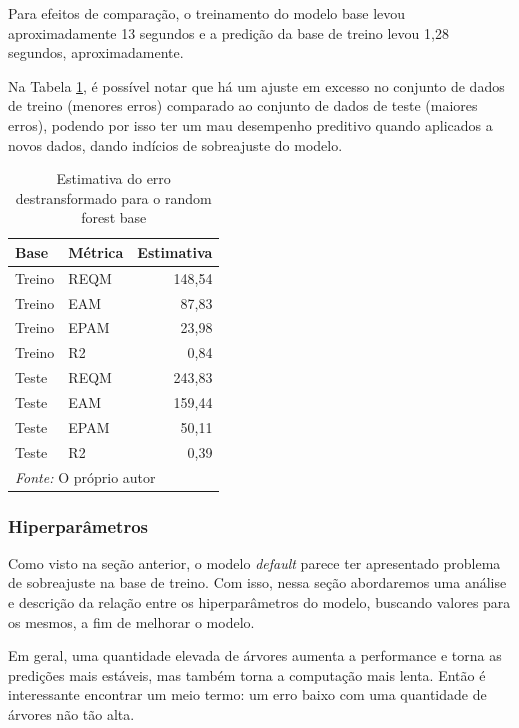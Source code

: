 \documentclass[
	12pt,				%
	a4paper,		%
	oneside,    %
	chapter=TITLE,		   %
	section=TITLE,		   %
	subsection=TITLE,	   %
	subsubsection=TITLE, %
	english,			%
	french,				%
	spanish,			%
	brazil,				%
]{abntex2}
\begin{document}
Para efeitos de comparação, o treinamento do modelo base levou
aproximadamente 13 segundos e a predição da base de treino levou 1,28
segundos, aproximadamente.

Na Tabela \ref{tab:rf0_metricas}, é possível notar que há um ajuste em
excesso no conjunto de dados de treino (menores erros) comparado ao
conjunto de dados de teste (maiores erros), podendo por isso ter um mau
desempenho preditivo quando aplicados a novos dados, dando indícios de
sobreajuste do modelo.

\begin{table}

\caption{\label{tab:rf0_metricas}Estimativa do erro destransformado para o random forest base}
\centering
\begin{tabular}[t]{l|l|r}
\hline
Base & Métrica & Estimativa\\
\hline
Treino & REQM & 148,54\\
\hline
Treino & EAM & 87,83\\
\hline
Treino & EPAM & 23,98\\
\hline
Treino & R2 & 0,84\\
\hline
Teste & REQM & 243,83\\
\hline
Teste & EAM & 159,44\\
\hline
Teste & EPAM & 50,11\\
\hline
Teste & R2 & 0,39\\
\hline
\multicolumn{3}{l}{\textit{Fonte: } O próprio autor}\\
\end{tabular}
\end{table}

\hypertarget{hiperparuxe2metros}{%
\subsubsection{Hiperparâmetros}\label{hiperparuxe2metros}}

Como visto na seção anterior, o modelo \emph{default} parece ter
apresentado problema de sobreajuste na base de treino. Com isso, nessa
seção abordaremos uma análise e descrição da relação entre os
hiperparâmetros do modelo, buscando valores para os mesmos, a fim de
melhorar o modelo.

Em geral, uma quantidade elevada de árvores aumenta a performance e
torna as predições mais estáveis, mas também torna a computação mais
lenta. Então é interessante encontrar um meio termo: um erro baixo com
uma quantidade de árvores não tão alta.
\end{document}
